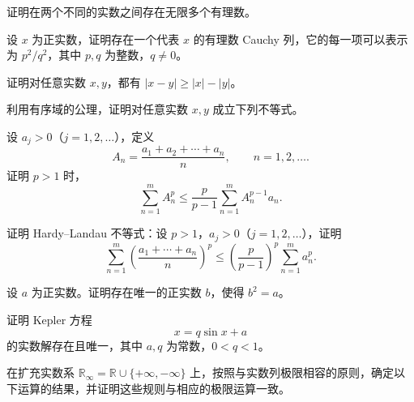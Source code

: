 \noindent\begin{minipage}{\textwidth}
证明在两个不同的实数之间存在无限多个有理数。
\end{minipage}\par\vfill
\noindent\begin{minipage}{\textwidth}
设 $x$ 为正实数，证明存在一个代表 $x$ 的有理数 Cauchy 列，它的每一项可以表示为 $p^2/q^2$，其中 $p,q$ 为整数，$q\ne0$。
\end{minipage}\par\vfill
\noindent\begin{minipage}{\textwidth}
证明对任意实数 $x,y$，都有 $|x-y|\ge|x|-|y|$。
\end{minipage}\par\vfill
\newpage
\noindent\begin{minipage}{\textwidth}
利用有序域的公理，证明对任意实数 $x,y$ 成立下列不等式。
\end{minipage}\par\vfill
\noindent\begin{minipage}{\textwidth}
设 $a_j>0$（$j=1,2,\ldots$），定义\[A_n=\frac{a_1+a_2+\cdots+a_n}{n},\qquad n=1,2,\ldots.\]证明 $p>1$ 时，\[\sum_{n=1}^{m}A_n^p\le\frac{p}{p-1}\sum_{n=1}^{m}A_n^{p-1}a_n.\]
\end{minipage}\par\vfill
\noindent\begin{minipage}{\textwidth}
证明 Hardy--Landau 不等式：设 $p>1$，$a_j>0$（$j=1,2,\ldots$），证明\[\sum_{n=1}^{m}\left(\frac{a_1+\cdots+a_n}{n}\right)^p\le\left(\frac{p}{p-1}\right)^p\sum_{n=1}^{m}a_n^p.\]
\end{minipage}\par\vfill
\noindent\begin{minipage}{\textwidth}
设 $a$ 为正实数。证明存在唯一的正实数 $b$，使得 $b^2=a$。
\end{minipage}\par\vfill
\newpage
\noindent\begin{minipage}{\textwidth}
证明 Kepler 方程\[x=q\sin x+a\]的实数解存在且唯一，其中 $a,q$ 为常数，$0<q<1$。
\end{minipage}\par\vfill
\noindent\begin{minipage}{\textwidth}
在扩充实数系 $\mathbb R_\infty=\mathbb R\cup\{+\infty,-\infty\}$ 上，按照与实数列极限相容的原则，确定以下运算的结果，并证明这些规则与相应的极限运算一致。
\end{minipage}\par\vfill
